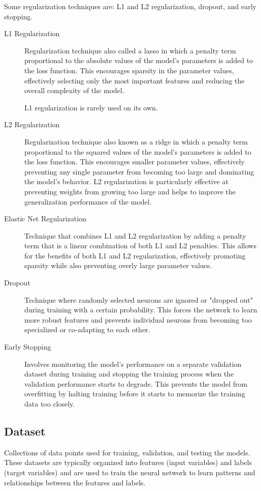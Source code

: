 \documentclass[a4paper]{article}
\begin{document}
Some regularization techniques are: L1 and L2 regularization, dropout, and early stopping.

\begin{description}
\item[L1 Regularization]
Regularization technique also called a lasso in which a penalty term proportional to the absolute values of the model's parameters is added to the loss function. This encourages sparsity in the parameter values, effectively selecting only the most important features and reducing the overall complexity of the model.

L1 regularization is rarely used on its own.

\item[L2 Regularization]
Regularization technique also known as a ridge in which a penalty term proportional to the squared values of the model's parameters is added to the loss function. This encourages smaller parameter values, effectively preventing any single parameter from becoming too large and dominating the model's behavior. L2 regularization is particularly effective at preventing weights from growing too large and helps to improve the generalization performance of the model.

\item[Elastic Net Regularization]
Technique that combines L1 and L2 regularization by adding a penalty term that is a linear combination of both L1 and L2 penalties. This allows for the benefits of both L1 and L2 regularization, effectively promoting sparsity while also preventing overly large parameter values.

\item[Dropout]
Technique where randomly selected neurons are ignored or "dropped out" during training with a certain probability. This forces the network to learn more robust features and prevents individual neurons from becoming too specialized or co-adapting to each other.

\item[Early Stopping]
Involves monitoring the model's performance on a separate validation dataset during training and stopping the training process when the validation performance starts to degrade. This prevents the model from overfitting by halting training before it starts to memorize the training data too closely.

\end{description}


\subsection*{Dataset}
Collections of data points used for training, validation, and testing the models. These datasets are typically organized into features (input variables) and labels (target variables) and are used to train the neural network to learn patterns and relationships between the features and labels.
\end{document}
